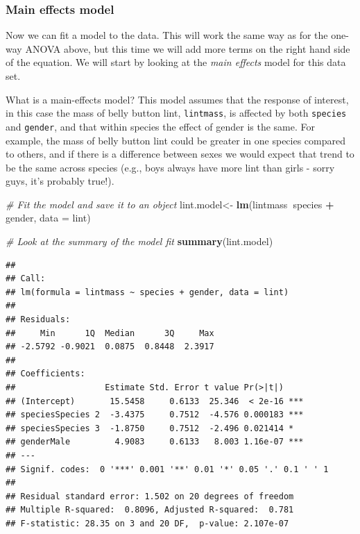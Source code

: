 \documentclass[
]{book}
\newenvironment{Shaded}{\begin{snugshade}}{\end{snugshade}}
\newcommand{\CommentTok}[1]{\textcolor[rgb]{0.56,0.35,0.01}{\textit{#1}}}
\newcommand{\DataTypeTok}[1]{\textcolor[rgb]{0.13,0.29,0.53}{#1}}
\newcommand{\KeywordTok}[1]{\textcolor[rgb]{0.13,0.29,0.53}{\textbf{#1}}}
\newcommand{\NormalTok}[1]{#1}
\newcommand{\OperatorTok}[1]{\textcolor[rgb]{0.81,0.36,0.00}{\textbf{#1}}}
\newcommand{\StringTok}[1]{\textcolor[rgb]{0.31,0.60,0.02}{#1}}
\begin{document}
\hypertarget{main-effects-model}{%
\subsubsection{Main effects model}\label{main-effects-model}}

Now we can fit a model to the data. This will work the same way as for the one-way ANOVA above, but this time we will add more terms on the right hand side of the equation. We will start by looking at the \emph{main effects} model for this data set.

What is a main-effects model? This model assumes that the response of interest, in this case the mass of belly button lint, \texttt{lintmass}, is affected by both \texttt{species} and \texttt{gender}, and that within species the effect of gender is the same. For example, the mass of belly button lint could be greater in one species compared to others, and if there is a difference between sexes we would expect that trend to be the same across species (e.g., boys always have more lint than girls - sorry guys, it's probably true!).

\begin{Shaded}
\begin{Highlighting}[]
\CommentTok{# Fit the model and save it to an object}
\NormalTok{lint.model<-}\StringTok{ }\KeywordTok{lm}\NormalTok{(lintmass}\OperatorTok{~}\NormalTok{species }\OperatorTok{+}\StringTok{ }\NormalTok{gender, }\DataTypeTok{data =}\NormalTok{ lint)}

\CommentTok{# Look at the summary of the model fit}
\KeywordTok{summary}\NormalTok{(lint.model)}
\end{Highlighting}
\end{Shaded}

\begin{verbatim}
## 
## Call:
## lm(formula = lintmass ~ species + gender, data = lint)
## 
## Residuals:
##     Min      1Q  Median      3Q     Max 
## -2.5792 -0.9021  0.0875  0.8448  2.3917 
## 
## Coefficients:
##                  Estimate Std. Error t value Pr(>|t|)    
## (Intercept)       15.5458     0.6133  25.346  < 2e-16 ***
## speciesSpecies 2  -3.4375     0.7512  -4.576 0.000183 ***
## speciesSpecies 3  -1.8750     0.7512  -2.496 0.021414 *  
## genderMale         4.9083     0.6133   8.003 1.16e-07 ***
## ---
## Signif. codes:  0 '***' 0.001 '**' 0.01 '*' 0.05 '.' 0.1 ' ' 1
## 
## Residual standard error: 1.502 on 20 degrees of freedom
## Multiple R-squared:  0.8096,	Adjusted R-squared:  0.781 
## F-statistic: 28.35 on 3 and 20 DF,  p-value: 2.107e-07
\end{verbatim}
\end{document}
